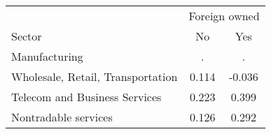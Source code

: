 \begin{tabular}{lcc}
\toprule
 & \multicolumn{2}{c}{Foreign owned} \\
\cmidrule(lr){2-3}
Sector & No & Yes \\
\midrule
Manufacturing & . & . \\
Wholesale, Retail, Transportation & 0.114 & -0.036 \\
Telecom and Business Services & 0.223 & 0.399 \\
Nontradable services & 0.126 & 0.292 \\
\bottomrule
\end{tabular}
